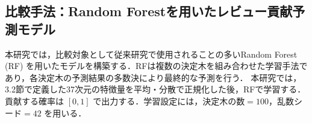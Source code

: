\documentclass[submit,noauthor,ses,dvipdfmx]{ipsj}
\newcommand{\todo}[1]{\colorbox{yellow}{{\bf TODO}:}{\color{red} {\textbf{[#1]}}}}
\begin{document}



\subsection{比較手法：Random Forestを用いたレビュー貢献予測モデル}

本研究では，比較対象として従来研究で使用されることの多いRandom Forest (RF) を用いたモデルを構築する．RFは複数の決定木を組み合わせた学習手法であり，各決定木の予測結果の多数決により最終的な予測を行う．
本研究では，3.2節で定義した37次元の特徴量を平均・分散で正規化した後，RFで学習する\cite{breiman_rf}．貢献する確率は $[0, 1]$ で出力する．学習設定には，決定木の数$= 100$，乱数シード$= 42$ を用いる．

\end{document}
